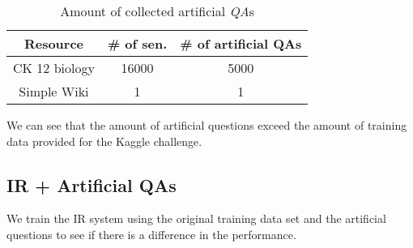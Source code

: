 \begin{table}[htp]
\caption{Amount of collected artificial \emph{QA}s}
\begin{center}
\begin{tabular}{|c|c|c|}
\hline
Resource&\# of sen.& \# of artificial QAs\\
\hline
CK 12 biology & 16000 & 5000\\
Simple Wiki & 1 & 1 \\
\hline
\end{tabular}
\end{center}
\label{artificialqa}
\end{table}%

We can see that the amount of artificial questions exceed the amount of training data provided for the Kaggle challenge.

\subsection{IR + Artificial QAs}
We train the IR system using the original training data set and the artificial questions to see if there is a difference in the performance.

